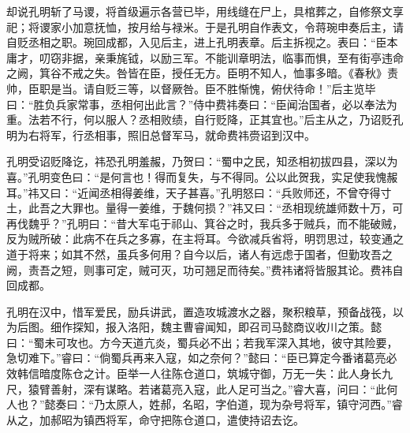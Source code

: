 却说孔明斩了马谡，将首级遍示各营已毕，用线缝在尸上，具棺葬之，自修祭文享祀；将谡家小加意抚恤，按月给与禄米。于是孔明自作表文，令蒋琬申奏后主，请自贬丞相之职。琬回成都，入见后主，进上孔明表章。后主拆视之。表曰：“臣本庸才，叨窃非据，亲秉旄钺，以励三军。不能训章明法，临事而惧，至有街亭违命之阙，箕谷不戒之失。咎皆在臣，授任无方。臣明不知人，恤事多暗。《春秋》责帅，臣职是当。请自贬三等，以督厥咎。臣不胜惭愧，俯伏待命！”后主览毕曰：“胜负兵家常事，丞相何出此言？”侍中费祎奏曰：“臣闻治国者，必以奉法为重。法若不行，何以服人？丞相败绩，自行贬降，正其宜也。”后主从之，乃诏贬孔明为右将军，行丞相事，照旧总督军马，就命费祎赍诏到汉中。

孔明受诏贬降讫，祎恐孔明羞赧，乃贺曰：“蜀中之民，知丞相初拔四县，深以为喜。”孔明变色曰：“是何言也！得而复失，与不得同。公以此贺我，实足使我愧赧耳。”祎又曰：“近闻丞相得姜维，天子甚喜。”孔明怒曰：“兵败师还，不曾夺得寸土，此吾之大罪也。量得一姜维，于魏何损？”祎又曰：“丞相现统雄师数十万，可再伐魏乎？”孔明曰：“昔大军屯于祁山、箕谷之时，我兵多于贼兵，而不能破贼，反为贼所破：此病不在兵之多寡，在主将耳。今欲减兵省将，明罚思过，较变通之道于将来；如其不然，虽兵多何用？自今以后，诸人有远虑于国者，但勤攻吾之阙，责吾之短，则事可定，贼可灭，功可翘足而待矣。”费祎诸将皆服其论。费祎自回成都。

孔明在汉中，惜军爱民，励兵讲武，置造攻城渡水之器，聚积粮草，预备战筏，以为后图。细作探知，报入洛阳，魏主曹睿闻知，即召司马懿商议收川之策。懿曰：“蜀未可攻也。方今天道亢炎，蜀兵必不出；若我军深入其地，彼守其险要，急切难下。”睿曰：“倘蜀兵再来入寇，如之奈何？”懿曰：“臣已算定今番诸葛亮必效韩信暗度陈仓之计。臣举一人往陈仓道口，筑城守御，万无一失：此人身长九尺，猿臂善射，深有谋略。若诸葛亮入寇，此人足可当之。”睿大喜，问曰：“此何人也？”懿奏曰：“乃太原人，姓郝，名昭，字伯道，现为杂号将军，镇守河西。”睿从之，加郝昭为镇西将军，命守把陈仓道口，遣使持诏去讫。

